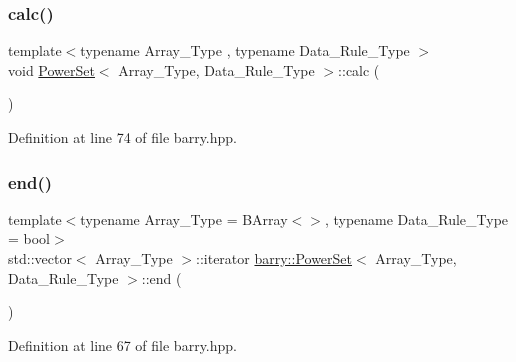 \mbox{\label{classbarry_1_1_power_set_ad3b707294498105b2cc1a04017cc96d2}} 
\subsubsection{\texorpdfstring{calc()}{calc()}}
{\footnotesize\ttfamily template$<$typename Array\+\_\+\+Type , typename Data\+\_\+\+Rule\+\_\+\+Type $>$ \\
void \hyperlink{classbarry_1_1_power_set}{Power\+Set}$<$ Array\+\_\+\+Type, Data\+\_\+\+Rule\+\_\+\+Type $>$\+::calc (\begin{DoxyParamCaption}{ }\end{DoxyParamCaption})\hspace{0.3cm}{\ttfamily [inline]}}



Definition at line 74 of file barry.\+hpp.

\mbox{\label{classbarry_1_1_power_set_a1fb01ffc52e39a831058c480e981da9e}} 
\subsubsection{\texorpdfstring{end()}{end()}}
{\footnotesize\ttfamily template$<$typename Array\+\_\+\+Type  = B\+Array$<$$>$, typename Data\+\_\+\+Rule\+\_\+\+Type  = bool$>$ \\
std\+::vector$<$ Array\+\_\+\+Type $>$\+::iterator \hyperlink{classbarry_1_1_power_set}{barry\+::\+Power\+Set}$<$ Array\+\_\+\+Type, Data\+\_\+\+Rule\+\_\+\+Type $>$\+::end (\begin{DoxyParamCaption}{ }\end{DoxyParamCaption})\hspace{0.3cm}{\ttfamily [inline]}}



Definition at line 67 of file barry.\+hpp.

\mbox{\label{classbarry_1_1_power_set_a53ca37c9cb14abd6f61bc0127ac9d067}} 
